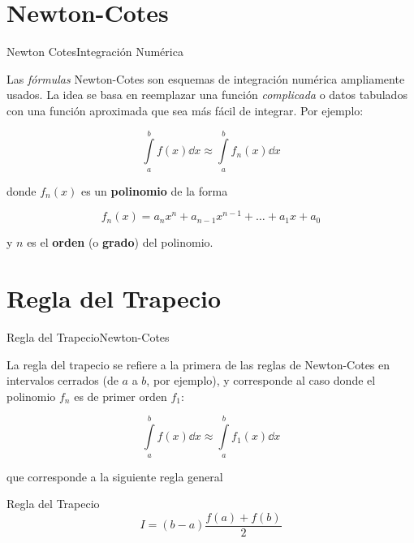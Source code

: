 \documentclass[spanish, c, dvipsnames]{beamer}
\begin{document}
\section{Newton-Cotes}

\begin{frame}{Newton Cotes}{Integración Numérica}

    Las \textit{fórmulas} \alert{Newton-Cotes} son esquemas de integración numérica ampliamente usados.
    La idea se basa en reemplazar una función \textit{complicada} o datos tabulados con una función aproximada que sea más fácil de integrar.
    Por ejemplo:

    $$\int\limits_a^b f(x)\dd{x} \approx  \int\limits_a^b f_n(x)\dd{x}$$

    donde $f_n(x)$ es un \textbf{polinomio} de la forma

    $$f_n(x) = a_n x^n + a_{n-1} x^{n-1} + \dots + a_1 x + a_0$$
    
    y $n$ es el \textbf{orden} (o \textbf{grado}) del polinomio.

\end{frame}

\section{Regla del Trapecio}

\begin{frame}{Regla del Trapecio}{Newton-Cotes}

    La \alert{regla del trapecio} se refiere a la primera de las reglas de Newton-Cotes en intervalos cerrados (de $a$ a $b$, por ejemplo), y corresponde al caso donde el polinomio $f_n$ es de \alert{primer orden} $f_1$:

    $$\int\limits_a^b f(x)\dd{x} \approx  \int\limits_a^b f_1(x)\dd{x}$$

    que corresponde a la siguiente regla general

    \begin{block}{Regla del Trapecio}
        \begin{equation}
            \label{eq:trapezoidal-single}
            I = (b-a) \frac{f(a) + f(b)}{2}
        \end{equation}
    \end{block}
\end{frame}
\end{document}
